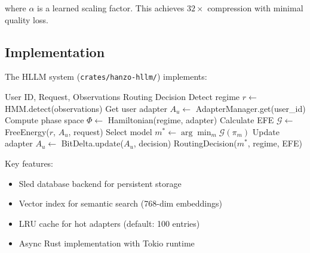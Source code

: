 where $\alpha$ is a learned scaling factor. This achieves $32\times$ compression with minimal quality loss.

\subsection{Implementation}

The HLLM system (\texttt{crates/hanzo-hllm/}) implements:

\begin{algorithm}
\caption{HLLM Routing Decision}
\begin{algorithmic}[1]
\REQUIRE User ID, Request, Observations
\ENSURE Routing Decision
\STATE Detect regime $r \leftarrow$ HMM.detect(observations)
\STATE Get user adapter $A_u \leftarrow$ AdapterManager.get(user\_id)
\STATE Compute phase space $\Phi \leftarrow$ Hamiltonian(regime, adapter)
\STATE Calculate EFE $\mathcal{G} \leftarrow$ FreeEnergy($r$, $A_u$, request)
\STATE Select model $m^* \leftarrow \arg\min_{m} \mathcal{G}(\pi_m)$
\STATE Update adapter $A_u \leftarrow$ BitDelta.update($A_u$, decision)
\RETURN RoutingDecision($m^*$, regime, EFE)
\end{algorithmic}
\end{algorithm}

Key features:
\begin{itemize}
\item Sled database backend for persistent storage
\item Vector index for semantic search (768-dim embeddings)
\item LRU cache for hot adapters (default: 100 entries)
\item Async Rust implementation with Tokio runtime
\end{itemize}

